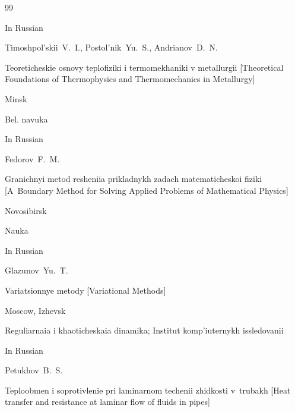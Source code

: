 \begin{thebibliography}{99}




\lang In Russian

\by Timoshpol'skii~V.~I., Postol'nik~Yu.~S., Andrianov~D.~N.

\book Teoreticheskie osnovy teplofiziki i termomekhaniki v metallurgii \rm [Theoretical Foundations of Thermophysics and Thermomechanics in Metallurgy]

\publaddr Minsk

\publ Bel. navuka








\lang In Russian

\by Fedorov~F.~M.

\book Granichnyi metod resheniia prikladnykh zadach matematicheskoi fiziki \rm [A~Boundary Method for Solving Applied Problems of Mathematical Physics]

\publaddr Novosibirsk

\publ Nauka








\lang In Russian

\by Glazunov~Yu.~T.

\book Variatsionnye metody \rm [Variational Methods]

\publaddr Moscow, Izhevsk

\publ Reguliarnaia i khaoticheskaia dinamika; Institut komp'iuternykh issledovanii








\lang In Russian

\by Petukhov~B.~S.

\book Teploobmen i soprotivlenie pri laminarnom techenii zhidkosti v~trubakh \rm [Heat transfer and resistance at laminar flow of fluids in pipes]


\end{thebibliography}
